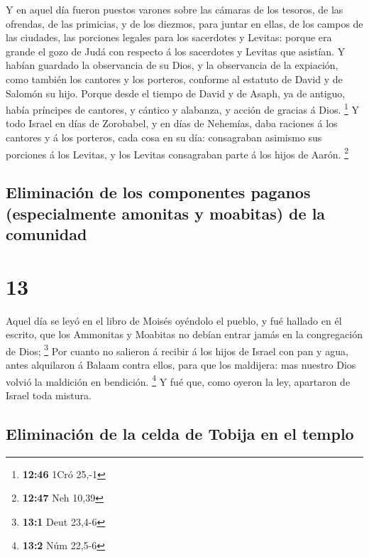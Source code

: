  Y en aquel día fueron puestos varones sobre las cámaras de
los tesoros, de las ofrendas, de las primicias, y de los diezmos, para
juntar en ellas, de los campos de las ciudades, las porciones legales
para los sacerdotes y Levitas: porque era grande el gozo de Judá con
respecto á los sacerdotes y Levitas que asistían.  Y habían
guardado la observancia de su Dios, y la observancia de la expiación,
como también los cantores y los porteros, conforme al estatuto de David
y de Salomón su hijo.  Porque desde el tiempo de David y de
Asaph, ya de antiguo, había príncipes de cantores, y cántico y alabanza,
y acción de gracias á Dios. \footnote{\textbf{12:46} 1Cró 25,-1}
 Y todo Israel en días de Zorobabel, y en días de Nehemías,
daba raciones á los cantores y á los porteros, cada cosa en su día:
consagraban asimismo sus porciones á los Levitas, y los Levitas
consagraban parte á los hijos de Aarón. \footnote{\textbf{12:47} Neh
  10,39}

\hypertarget{eliminaciuxf3n-de-los-componentes-paganos-especialmente-amonitas-y-moabitas-de-la-comunidad}{%
\subsection{Eliminación de los componentes paganos (especialmente
amonitas y moabitas) de la
comunidad}\label{eliminaciuxf3n-de-los-componentes-paganos-especialmente-amonitas-y-moabitas-de-la-comunidad}}

\hypertarget{section-12}{%
\section{13}\label{section-12}}

 Aquel día se leyó en el libro de Moisés oyéndolo el pueblo,
y fué hallado en él escrito, que los Ammonitas y Moabitas no debían
entrar jamás en la congregación de Dios; \footnote{\textbf{13:1} Deut
  23,4-6}  Por cuanto no salieron á recibir á los hijos de
Israel con pan y agua, antes alquilaron á Balaam contra ellos, para que
los maldijera: mas nuestro Dios volvió la maldición en bendición.
\footnote{\textbf{13:2} Núm 22,5-6}  Y fué que, como oyeron
la ley, apartaron de Israel toda mistura.

\hypertarget{eliminaciuxf3n-de-la-celda-de-tobija-en-el-templo}{%
\subsection{Eliminación de la celda de Tobija en el
templo}\label{eliminaciuxf3n-de-la-celda-de-tobija-en-el-templo}}


